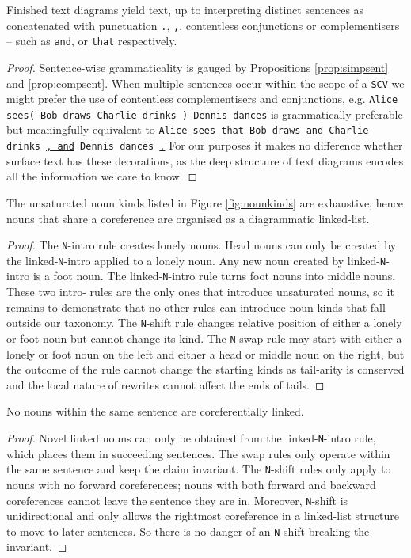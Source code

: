 \begin{proposition}
Finished text diagrams yield text, up to interpreting distinct sentences as concatenated with punctuation \texttt{.}, \texttt{,}, contentless conjunctions or complementisers -- such as \texttt{and}, or \texttt{that} respectively.
\begin{proof}
Sentence-wise grammaticality is gauged by Propositions \ref{prop:simpsent} and \ref{prop:compsent}. When multiple sentences occur within the scope of a \texttt{SCV} we might prefer the use of contentless complementisers and conjunctions, e.g. \texttt{Alice sees( Bob draws Charlie drinks ) Dennis dances} is grammatically preferable but meaningfully equivalent to \texttt{Alice sees \underline{that} Bob draws \underline{and} Charlie drinks \underline{, and} Dennis dances \underline{.}} For our purposes it makes no difference whether surface text has these decorations, as the deep structure of text diagrams encodes all the information we care to know.
\end{proof}
\end{proposition}

\begin{lemma}\label{prop:linkedlist}
The unsaturated noun kinds listed in Figure \ref{fig:nounkinds} are exhaustive, hence nouns that share a coreference are organised as a diagrammatic linked-list.
\begin{proof}
The \texttt{N}-intro rule creates lonely nouns. Head nouns can only be created by the linked-\texttt{N}-intro applied to a lonely noun. Any new noun created by linked-\texttt{N}-intro is a foot noun. The linked-\texttt{N}-intro rule turns foot nouns into middle nouns. These two intro- rules are the only ones that introduce unsaturated nouns, so it remains to demonstrate that no other rules can introduce noun-kinds that fall outside our taxonomy. The \texttt{N}-shift rule changes relative position of either a lonely or foot noun but cannot change its kind. The \texttt{N}-swap rule may start with either a lonely or foot noun on the left and either a head or middle noun on the right, but the outcome of the rule cannot change the starting kinds as tail-arity is conserved and the local nature of rewrites cannot affect the ends of tails.
\end{proof}
\end{lemma}

\begin{lemma}\label{prop:norefl}
No nouns within the same sentence are coreferentially linked.
\begin{proof}
Novel linked nouns can only be obtained from the linked-\texttt{N}-intro rule, which places them in succeeding sentences. The swap rules only operate within the same sentence and keep the claim invariant. The \texttt{N}-shift rules only apply to nouns with no forward coreferences; nouns with both forward and backward coreferences cannot leave the sentence they are in. Moreover, \texttt{N}-shift is unidirectional and only allows the rightmost coreference in a linked-list structure to move to later sentences. So there is no danger of an \texttt{N}-shift breaking the invariant.
\end{proof}
\end{lemma}

